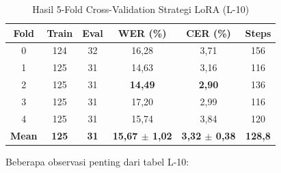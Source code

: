 \begin{table}[H]
\centering
\caption{Hasil 5-Fold Cross-Validation Strategi LoRA (L-10)}
\label{tab:lora_cv_results}
\begin{tabular}{|c|c|c|c|c|c|}
\hline
\textbf{Fold} & \textbf{Train} & \textbf{Eval} & \textbf{WER (\%)} & \textbf{CER (\%)} & \textbf{Steps} \\
\hline
0 & 124 & 32 & 16,28 & 3,71 & 156 \\
\hline
1 & 125 & 31 & 14,63 & 3,16 & 116 \\
\hline
2 & 125 & 31 & \textbf{14,49} & \textbf{2,90} & 136 \\
\hline
3 & 125 & 31 & 17,20 & 2,99 & 116 \\
\hline
4 & 125 & 31 & 15,74 & 3,84 & 120 \\
\hline
\hline
\textbf{Mean} & \textbf{125} & \textbf{31} & \textbf{15,67 $\pm$ 1,02} & \textbf{3,32 $\pm$ 0,38} & \textbf{128,8} \\
\hline
\end{tabular}
\end{table}

Beberapa observasi penting dari tabel L-10:


